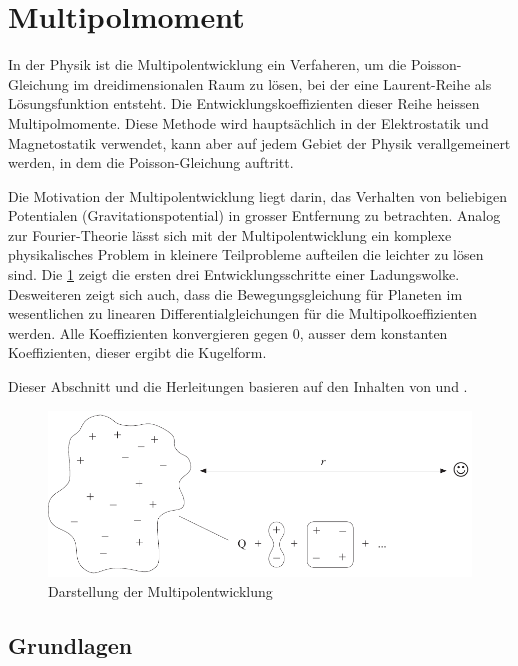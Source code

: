 %
%
%
%
\section{Multipolmoment
\label{planet:section:multipol}}
In der Physik ist die Multipolentwicklung ein Verfaheren, um die Poisson-Gleichung im dreidimensionalen Raum zu lösen, bei der eine Laurent-Reihe als Lösungsfunktion entsteht.
Die Entwicklungskoeffizienten dieser Reihe heissen Multipolmomente.
Diese Methode wird hauptsächlich in der Elektrostatik und Magnetostatik verwendet, kann aber auf jedem Gebiet der Physik verallgemeinert werden, in dem die Poisson-Gleichung auftritt.

Die Motivation der Multipolentwicklung liegt darin, das Verhalten von beliebigen Potentialen (Gravitationspotential) in grosser Entfernung zu betrachten.
Analog zur Fourier-Theorie lässt sich mit der Multipolentwicklung ein komplexe physikalisches Problem in kleinere Teilprobleme aufteilen die leichter zu lösen sind.
Die \cref{planet:fig:multipol} zeigt die ersten drei Entwicklungsschritte einer Ladungswolke.
Desweiteren zeigt sich auch, dass die Bewegungsgleichung für Planeten im wesentlichen zu linearen Differentialgleichungen für die Multipolkoeffizienten werden.
Alle Koeffizienten konvergieren gegen 0, ausser dem konstanten Koeffizienten, dieser ergibt die Kugelform.

Dieser Abschnitt und die Herleitungen basieren auf den Inhalten von \cite{planet:multi} und \cite{planet:quadro}.

\begin{figure}[h!]
    \centering
    \includegraphics[width=\linewidth]{papers/planet/pictures/Multipol.pdf}
    \caption{Darstellung der Multipolentwicklung
        \label{planet:fig:multipol}}
\end{figure}

\subsection{Grundlagen
\label{planet:subsection:grundlagen}}

